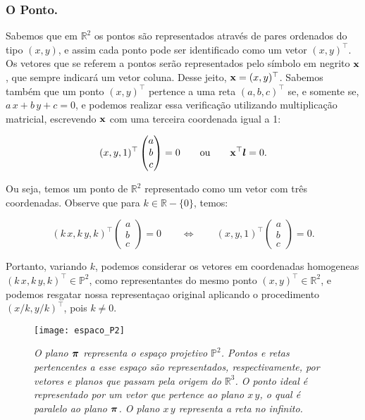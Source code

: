 \subsubsection{O Ponto.}\label{sec.ponto}


Sabemos que em $\mathbb{R}^{2}$ os pontos são representados através de pares ordenados do tipo $(x,y)$, e assim cada ponto pode ser identificado como um vetor $(x,y)^\top$. Os vetores que se referem a pontos serão representados pelo símbolo em negrito $\mathbf{x}$, que sempre indicará um vetor coluna. Desse jeito, $\mathbf{x}=(x,y)^\top$. Sabemos também que um ponto $(x,y)^\top$ pertence a uma reta $(a,b,c)^\top$ se, e somente se, $a\,x+b\,y+c=0$, e podemos realizar essa verificação utilizando multiplicação matricial, escrevendo $\mathbf{x}$ com uma terceira coordenada igual a 1:

\begin{equation*}
(x,y,1)^\top 
\begin{pmatrix}
 a  \\ 
 b  \\ 
 c 
 \end{pmatrix} 
 = 0 \qquad 
 \text{ou} 
 \qquad \mathbf{x} ^\top\boldsymbol{l} = 0.
\end{equation*}

Ou seja, temos um ponto de $\mathbb{R}^{2}$ representado como um vetor com três coordenadas. Observe que para $k \in \mathbb{R} - \{0\}$, temos:

\begin{equation*}
(k\,x,k\,y,k)^\top 
\begin{pmatrix}
 a  \\ 
 b  \\ 
 c 
 \end{pmatrix} 
 = 0
 \qquad \Leftrightarrow \qquad
 (x,y,1)^\top
\begin{pmatrix}
 a  \\ 
 b  \\ 
 c 
 \end{pmatrix} 
 = 0.
\end{equation*}

Portanto,  variando $k$, podemos considerar os vetores em coordenadas homogeneas $(k\,x,k\,y,k)^\top \in \mathbb{P}^2$, como representantes do mesmo ponto $(x,y)^\top \in \mathbb{R}^2$, e podemos resgatar nossa representaçao original aplicando o procedimento $(x/k,y/k)^\top$, pois $k \ne 0$.

\begin{figure}[!htb]
\centering
\texttt{[image: espaco\_P2]}
\caption{\textit{O plano $\boldsymbol{\pi}$ representa o espaço projetivo $\mathbb{P}^2$. Pontos e retas pertencentes a esse espaço são representados, respectivamente, por vetores e planos que passam pela origem do $\mathbb{R}^3$. O ponto ideal é representado por um vetor que pertence ao plano $x\,y$, o qual é paralelo ao plano $\boldsymbol{\pi}$. O plano $x\,y$ representa a reta no infinito.}}
\label{plano_P2}
\end{figure}

